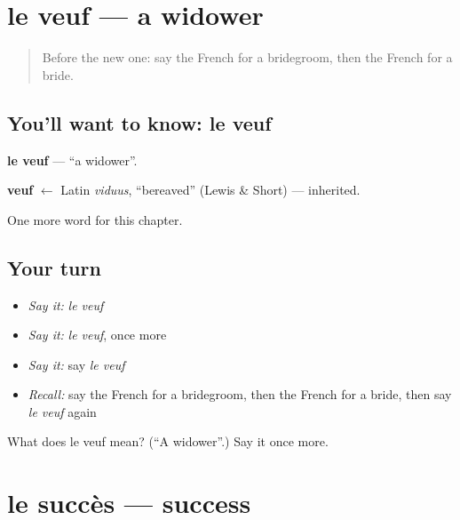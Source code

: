 \section[le veuf]{le veuf — a widower}

\label{lesson:FR-C197-veuf}



\begin{quote}
Before the new one: say the French for a bridegroom, then the French for a bride.
\end{quote}

\subsection*{You'll want to know: le veuf}
\textbf{le veuf} — \textquotedblleft{}a widower\textquotedblright{}.

\begin{cousinweb}
\textbf{veuf} $\leftarrow$ Latin \emph{viduus}, \textquotedblleft{}bereaved\textquotedblright{} (Lewis \& Short) — inherited.
\end{cousinweb}

\begin{grammarlens}[title={What you've built}]
One more word for this chapter.
\end{grammarlens}

\subsection*{Your turn}
\begin{itemize}
\raggedright
  \item \emph{Say it:} \emph{le veuf}
  \item \emph{Say it:} \emph{le veuf}, once more
  \item \emph{Say it:} say \emph{le veuf}
  \item \emph{Recall:} say the French for a bridegroom, then the French for a bride, then say \emph{le veuf} again
\end{itemize}

\begin{tcolorbox}[breakable,colback=teal!4,colframe=teal!35!black,title={Before you move on}]
What does le veuf mean? (\textquotedblleft{}A widower\textquotedblright{}.) Say it once more.
\end{tcolorbox}
\section[le succès]{le succès — success}

